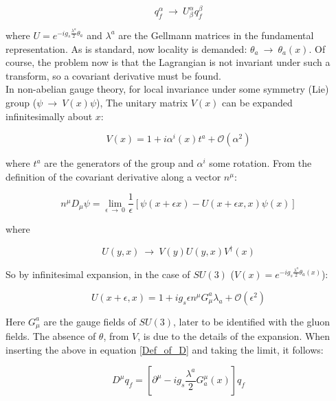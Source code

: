 \documentclass[11pt,a4paper]{article}
\begin{document}
\begin{equation}
	q_f^\alpha \:\rightarrow\: U^\alpha_\beta q_f^\beta
\end{equation} 

where $U = e^{-ig_s\frac{\lambda^a}{2}\theta_a}$ and $\lambda^a$ are the Gellmann matrices in the fundamental representation. As is standard, now locality is demanded: $\theta_a \:\rightarrow\: \theta_a(x)$. Of course, the problem now is that the Lagrangian is not invariant under such a transform, so a covariant derivative must be found.\\
In non-abelian gauge theory, for local invariance under some symmetry (Lie) group ($\psi \:\rightarrow\: V(x)\psi$), The unitary matrix $V(x)$ can be expanded infinitesimally about $x$:

\begin{equation}
	V(x) = 1 + i\alpha^i(x)t^a + \mathcal{O}(\alpha^2)
\end{equation}

where $t^a$ are the generators of the group and $\alpha^i$ some rotation. From the definition of the covariant derivative along a vector $n^\mu$:

\begin{equation}
	n^\mu D_\mu\psi = \lim_{\epsilon\:\rightarrow\:0} \frac{1}{\epsilon}\left[\psi(x+\epsilon x) - U(x+\epsilon x,x)\psi(x)\right]
	\label{Def_of_D}
\end{equation}

where

\begin{equation}
	U(y,x) \:\rightarrow\: V(y)U(y,x)V^\dagger(x)
\end{equation}

So by infinitesimal expansion, in the case of $SU(3)$ ($V(x) = e^{-ig_s\frac{\lambda^a}{2}\theta_a(x)}$):

\begin{equation}
	U(x+\epsilon, x) = 1 + ig_s\epsilon n^\mu G_\mu^a \lambda_a + \mathcal{O}(\epsilon^2)
\end{equation}

Here $G_\mu^a$ are the gauge fields of $SU(3)$, later to be identified with the gluon fields. The absence of $\theta$, from $V$, is due to the details of the expansion. When inserting the above in equation \ref{Def_of_D} and taking the limit, it follows:

\begin{equation}
	D^\mu q_f = \left[ \partial^\mu - ig_s\frac{\lambda^a}{2}G_a^\mu(x) \right]q_f
\end{equation}
\end{document}
